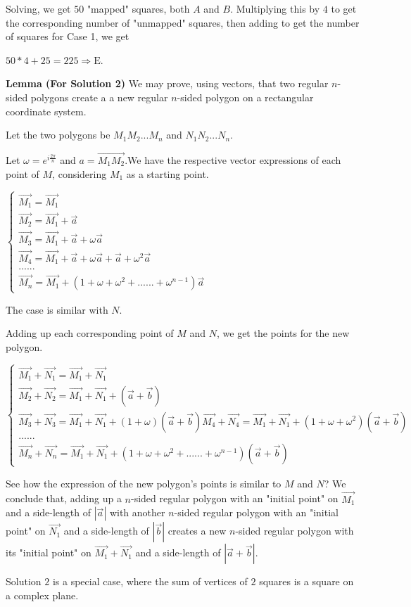 \begin{enumerate}
 
Solving, we get $50$ "mapped" squares, both $A$ and $B$. Multiplying this by $4$ to get the corresponding number of "unmapped" squares, then adding to get the number of squares for Case 1, we get

 
$50*4 + 25 = 225 \Rightarrow \boxed{\text{E}}$.

 \textbf{Lemma (For Solution 2)} We may prove, using vectors, that two regular $n$-sided polygons create a a new regular $n$-sided polygon on a rectangular coordinate system.

 Let the two polygons be $M_1 M_2 ... M_n$ and $N_1 N_2 ... N_n$.

 Let $\omega = e^{i\frac{2\pi}{n}}$ and $a = \vec{M_1 M_2}$.We have the respective vector expressions of each point of $M$, considering $M_1$ as a starting point.

 $\begin{cases} 	\vec{M_1} = \vec{M_1} \\ 	\vec{M_2} = \vec{M_1}+\vec{a} \\ 	\vec{M_3} = \vec{M_1}+\vec{a}+\omega\vec{a} \\         \vec{M_4} = \vec{M_1}+\vec{a}+\omega\vec{a}+\vec{a}+\omega^2 \vec{a} \\         ...... \\         \vec{M_n} = \vec{M_1}+(1+\omega+\omega^2+......+\omega^{n-1})\vec{a} \end{cases}$

 The case is similar with $N$.

 Adding up each corresponding point of $M$ and $N$, we get the points for the new polygon.

 $\begin{cases} 	\vec{M_1} + \vec{N_1} = \vec{M_1} + \vec{N_1} \\ 	\vec{M_2} + \vec{N_2} = \vec{M_1} + \vec{N_1} + (\vec{a} + \vec{b})\\         \vec{M_3} + \vec{N_3} = \vec{M_1} + \vec{N_1} + (1 + \omega)(\vec{a} + \vec{b})         \vec{M_4} + \vec{N_4} = \vec{M_1} + \vec{N_1} + (1 + \omega + \omega^2)(\vec{a} + \vec{b})\\         ...... \\         \vec{M_n} + \vec{N_n} = \vec{M_1} + \vec{N_1} + (1+\omega+\omega^2+......+\omega^{n-1})(\vec{a} + \vec{b})  \end{cases}$

 See how the expression of the new polygon's points is similar to $M$ and $N$? We conclude that, adding up a $n$-sided regular polygon with an "initial point" on $\vec{M_1}$ and a side-length of $\left| \vec{a}\right|$ with another $n$-sided regular polygon with an "initial point" on $\vec{N_1}$ and a side-length of $\left| \vec{b}\right|$ creates a new $n$-sided regular polygon with its "initial point" on $\vec{M_1}+\vec{N_1}$ and a side-length of $\left| \vec{a}+\vec{b}\right|$.

 Solution $2$ is a special case, where the sum of vertices of $2$ squares is a square on a complex plane.

 


\end{enumerate}